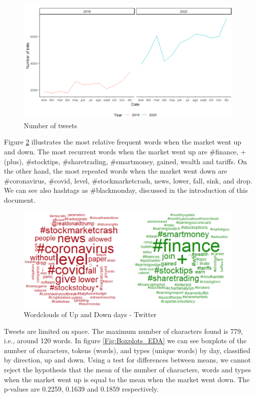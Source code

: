 \documentclass[a4paper, 12pt]{report}
\begin{document}
    \begin{figure}[H]
    \centering
    \includegraphics[scale=0.7]{graphs/Twitter/No_twits.png}
    \caption{Number of tweets}
    \label{Fig:No_twits}
    \end{figure}

    Figure \ref{Fig:pos_neg_wordclouds} illustrates the most relative frequent words when the market went up and down. The most recurrent words when the market went up are {\#}finance, + (plus), {\#}stocktips, {\#}sharetrading, {\#}smartmoney, gained, wealth and tariffs. On the other hand, the most repeated words when the market went down are {\#}coronavirus, {\#}covid, level, {\#}stockmarketcrash, news, lower, fall, sink, and drop. We can see also hashtags as {\#}blackmonday, discussed in the introduction of this document. 

    \begin{figure}[H]
    \centering
    \includegraphics[scale=0.65]{graphs/Twitter/pos_neg_wordclouds.png}
    \caption{Wordclouds of Up and Down days - Twitter}
    \label{Fig:pos_neg_wordclouds}
    \end{figure}


    Tweets are limited on space. The maximum number of characters found is 779, i.e., around 120 words. In figure \ref{Fig:Boxplots_EDA} we can see boxplots of the number of characters, tokens (words), and types (unique words) by day, classified by direction, up and down. Using a test for differences between means,  we cannot reject the hypothesis that the mean of the number of characters, words and types when the market went up is equal to the mean when the market went down. The p-values are 0.2259, 0.1639 and 0.1859 respectively. 
    
\end{document}
